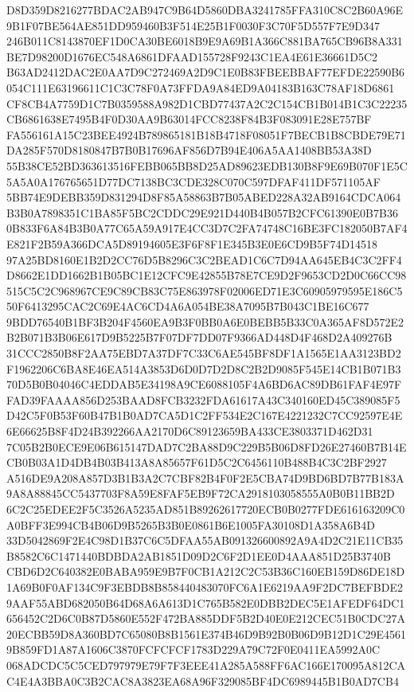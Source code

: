 \documentclass[UTF8,fontset=fandol,zihao=-4,a4paper]{ctexart}
\begin{document}
{{D8D359D8216277BDAC2AB947C9B64D5860DBA3241785FFA310C8C2B60A96E9B1F07BE564AE851DD959460B3F514E25B1F0030F3C70F5D557F7E9D347
246B011C8143870EF1D0CA30BE6018B9E9A69B1A366C881BA765CB96B8A331BE7D98200D1676EC548A6861DFAAD155728F9243C1EA4E61E36661D5C2
B63AD2412DAC2E0AA7D9C272469A2D9C1E0B83FBEEBBAF77EFDE22590B6054C111E63196611C1C3C78F0A73FFDA9A84ED9A04183B163C78AF18D6861
CF8CB4A7759D1C7B0359588A982D1CBD77437A2C2C154CB1B014B1C3C22235CB6861638E7495B4F0D30AA9B63014FCC8238F84B3F083091E28E757BF
FA556161A15C23BEE4924B789865181B18B4718F08051F7BECB1B8CBDE79E71DA285F570D8180847B7B0B17696AF856D7B94E406A5AA1408BB53A38D
55B38CE52BD363613516FEBB065BB8D25AD89623EDB130B8F9E69B070F1E5C5A5A0A176765651D77DC7138BC3CDE328C070C597DFAF411DF571105AF
5BB74E9DEBB359D831294D8F85A58863B7B05ABED228A32AB9164CDCA064B3B0A7898351C1BA85F5BC2CDDC29E921D440B4B057B2CFC61390E0B7B36
0B833F6A84B3B0A77C65A59A917E4CC3D7C2FA74748C16BE3FC182050B7AF4E821F2B59A366DCA5D89194605E3F6F8F1E345B3E0E6CD9B5F74D14518
97A25BD8160E1B2D2CC76D5B8296C3C2BEAD1C6C7D94AA645EB4C3C2FF4D8662E1DD1662B1B05BC1E12CFC9E42855B78E7CE9D2F9653CD2D0C66CC98
515C5C2C968967CE9C89CB83C75E863978F02006ED71E3C60905979595E186C550F6413295CAC2C69E4AC6CD4A6A054BE38A7095B7B043C1BE16C677
9BDD76540B1BF3B204F4560EA9B3F0BB0A6E0BEBB5B33C0A365AF8D572E2B2B071B3B06E617D9B5225B7F07DF7DD07F9366AD448D4F468D2A409276B
31CCC2850B8F2AA75EBD7A37DF7C33C6AE545BF8DF1A1565E1AA3123BD2F1962206C6BA8E46EA514A3853D6D0D7D2D8C2B2D9085F545E14CB1B071B3
70D5B0B04046C4EDDAB5E34198A9CE6088105F4A6BD6AC89DB61FAF4E97FFAD39FAAAA856D253BAAD8FCB3232FDA61617A43C340160ED45C389085F5
D42C5F0B53F60B47B1B0AD7CA5D1C2FF534E2C167E4221232C7CC92597E4E6E66625B8F4D24B392266AA2170D6C89123659BA433CE3803371D462D31
7C05B2B0ECE9E06B615147DAD7C2BA88D9C229B5B06D8FD26E27460B7B14ECB0B03A1D4DB4B03B413A8A85657F61D5C2C6456110B488B4C3C2BF2927
A516DE9A208A857D3B1B3A2C7CBF82B4F0F2E5CBA74D9BD6BD7B77B183A9A8A88845CC5437703F8A59E8FAF5EB9F72CA2918103058555A0B0B11BB2D
6C2C25EDEE2F5C3526A5235AD851B89262617720ECB0B0277FDE616163209C0A0BFF3E994CB4B06D9B5265B3B0E0861B6E1005FA30108D1A358A6B4D
33D5042869F2E4C98D1B37C6C5DFAA55AB091326600892A9A4D2C21E11CB35B8582C6C1471440BDBDA2AB1851D09D2C6F2D1EE0D4AAA851D25B3740B
CBD6D2C640382E0BABA959E9B7F0CB1A212C2C53B36C160EB159D86DE18D1A69B0F0AF134C9F3EBDB8B858440483070FC6A1E6219AA9F2DC7BEFBDE2
9AAF55ABD682050B64D68A6A613D1C765B582E0DBB2DEC5E1AFEDF64DC1656452C2D6C0B87D5860E552F472BA885DDF5B2D40E0E212CEC51B0CDC27A
20ECBB59D8A360BD7C65080B8B1561E374B46D9B92B0B06D9B12D1C29E45619B859FD1A87A1606C3870FCFCFCF1783D229A79C72F0E0411EA5992A0C
068ADCDC5C5CED797979E79F7F3EEE41A285A588FF6AC166E170095A812CAC4E4A3BBA0C3B2CAC8A3823EA68A96F329085BF4DC6989445B1B0AD7CB4
}}
\end{document}
